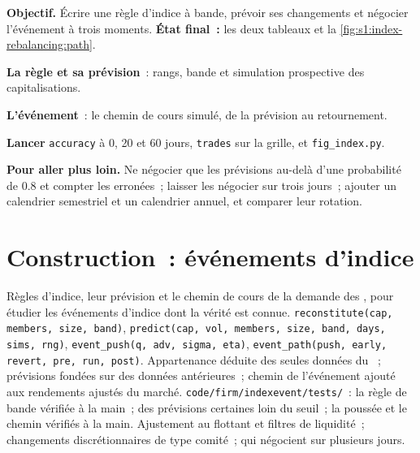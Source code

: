 \begin{tutorial}
\textbf{Objectif.} Écrire une règle d'indice à bande, prévoir ses changements et négocier l'événement à trois moments. \textbf{État final~:} les deux tableaux et
la \cref{fig:s1:index-rebalancing:path}.
\begin{tutsteps}
\item \textbf{La règle et sa prévision}~: rangs, bande et simulation prospective des capitalisations.
\label{lst:s1:index-rebalancing:rule}
\item \textbf{L'événement}~: le chemin de cours simulé, de la prévision au retournement.
\label{lst:s1:index-rebalancing:path}
\item \textbf{Lancer} \texttt{accuracy} à 0, 20 et 60 jours, \texttt{trades} sur la grille, et \texttt{fig\_index.py}.
\end{tutsteps}
\textbf{Pour aller plus loin.} Ne négocier que les prévisions au-delà d'une probabilité de 0.8 et compter les erronées~; laisser les  négocier sur trois jours~; ajouter un
calendrier semestriel et un calendrier annuel, et comparer leur rotation.
\end{tutorial}

\section{Construction~: événements d'indice}\label{bld:s1:index-rebalancing:indexevent}

\begin{build}
 Règles d'indice, leur prévision et le chemin de cours de la demande des , pour étudier les événements d'indice dont la vérité est connue.
 \texttt{reconstitute(cap, members, size, band)}, \texttt{predict(cap, vol, members, size, band, days, sims, rng)},
\texttt{event\_push(q, adv, sigma, eta)}, \texttt{event\_path(push, early, revert, pre, run, post)}.
 Appartenance déduite des seules données du ~; prévisions fondées sur des données antérieures~; chemin de l'événement ajouté aux rendements ajustés du marché.
 \texttt{code/firm/indexevent/tests/}~: la règle de bande vérifiée à la main~; des prévisions certaines loin du seuil~; la poussée et le chemin vérifiés à la main.
 Ajustement au flottant et filtres de liquidité~; changements discrétionnaires de type comité~;  qui négocient sur plusieurs jours.
\end{build}

